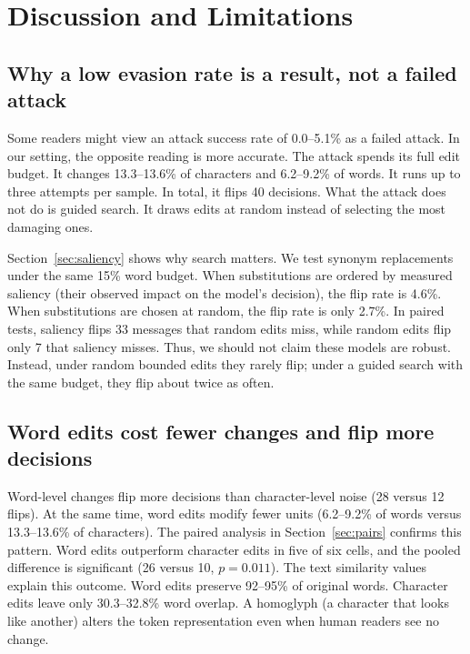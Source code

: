 \section{Discussion and Limitations}
\label{sec:discussion}

\subsection{Why a low evasion rate is a result, not a failed attack}

Some readers might view an attack success rate of 0.0--5.1\% as a failed
attack. In our setting, the opposite reading is more accurate. The attack
spends its full edit budget. It changes 13.3--13.6\% of characters and
6.2--9.2\% of words. It runs up to three attempts per sample. In total, it flips
40 decisions. What the attack does not do is guided search. It draws edits at
random instead of selecting the most damaging ones.

Section~\ref{sec:saliency} shows why search matters. We test synonym
replacements under the same 15\% word budget. When substitutions are ordered by
measured saliency (their observed impact on the model's decision), the flip rate
is 4.6\%. When substitutions are chosen at random, the flip rate is only 2.7\%.
In paired tests, saliency flips 33 messages that random edits miss, while
random edits flip only 7 that saliency misses. Thus, we should not claim these
models are robust. Instead, under random bounded edits they rarely flip; under a
guided search with the same budget, they flip about twice as often.

\subsection{Word edits cost fewer changes and flip more decisions}

Word-level changes flip more decisions than character-level noise (28 versus 12
flips). At the same time, word edits modify fewer units (6.2--9.2\% of words
versus 13.3--13.6\% of characters). The paired analysis in
Section~\ref{sec:pairs} confirms this pattern. Word edits outperform character edits
in five of six cells, and the pooled difference is significant (26 versus 10,
$p=0.011$). The text similarity values explain this outcome. Word edits preserve
92--95\% of original words. Character edits leave only 30.3--32.8\% word overlap.
A homoglyph (a character that looks like another) alters the token
representation even when human readers see no change.

